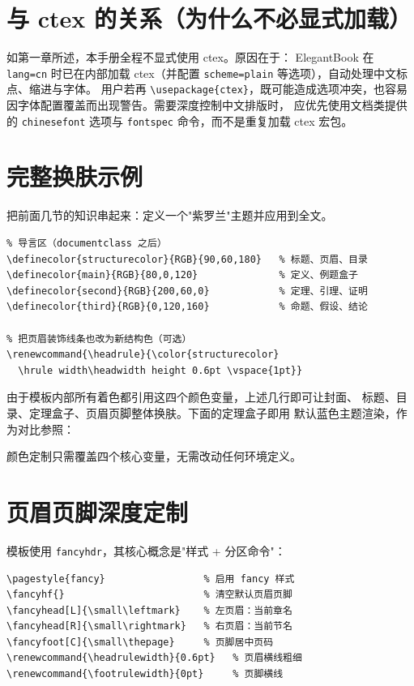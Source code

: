 \section{与 ctex 的关系（为什么不必显式加载）}

如第一章所述，本手册全程不显式使用 ctex。原因在于：
ElegantBook 在 \texttt{lang=cn} 时已在内部加载 ctex（并配置
\verb|scheme=plain| 等选项），自动处理中文标点、缩进与字体。
用户若再 \verb|\usepackage{ctex}|，既可能造成选项冲突，也容易
因字体配置覆盖而出现警告。需要深度控制中文排版时，
应优先使用文档类提供的 \texttt{chinesefont} 选项与
\texttt{fontspec} 命令，而不是重复加载 ctex 宏包。

\section{完整换肤示例}

把前面几节的知识串起来：定义一个"紫罗兰"主题并应用到全文。

\begin{lstlisting}
% 导言区（documentclass 之后）
\definecolor{structurecolor}{RGB}{90,60,180}   % 标题、页眉、目录
\definecolor{main}{RGB}{80,0,120}              % 定义、例题盒子
\definecolor{second}{RGB}{200,60,0}            % 定理、引理、证明
\definecolor{third}{RGB}{0,120,160}            % 命题、假设、结论

% 把页眉装饰线条也改为新结构色（可选）
\renewcommand{\headrule}{\color{structurecolor}
  \hrule width\headwidth height 0.6pt \vspace{1pt}}
\end{lstlisting}

由于模板内部所有着色都引用这四个颜色变量，上述几行即可让封面、
标题、目录、定理盒子、页眉页脚整体换肤。下面的定理盒子即用
默认蓝色主题渲染，作为对比参照：

\begin{theorem}[换肤效果]
颜色定制只需覆盖四个核心变量，无需改动任何环境定义。
\end{theorem}

\section{页眉页脚深度定制}

模板使用 \texttt{fancyhdr}，其核心概念是"样式 + 分区命令"：

\begin{lstlisting}
\pagestyle{fancy}                 % 启用 fancy 样式
\fancyhf{}                        % 清空默认页眉页脚
\fancyhead[L]{\small\leftmark}    % 左页眉：当前章名
\fancyhead[R]{\small\rightmark}   % 右页眉：当前节名
\fancyfoot[C]{\small\thepage}     % 页脚居中页码
\renewcommand{\headrulewidth}{0.6pt}   % 页眉横线粗细
\renewcommand{\footrulewidth}{0pt}     % 页脚横线
\end{lstlisting}

